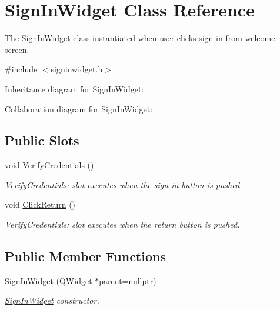 \hypertarget{classSignInWidget}{}\section{Sign\+In\+Widget Class Reference}
\label{classSignInWidget}


The \hyperlink{classSignInWidget}{Sign\+In\+Widget} class instantiated when user clicks sign in from welcome screen.  




{\ttfamily \#include $<$signinwidget.\+h$>$}



Inheritance diagram for Sign\+In\+Widget\+:


Collaboration diagram for Sign\+In\+Widget\+:
\subsection*{Public Slots}
\begin{DoxyCompactItemize}
\item 
void \hyperlink{classSignInWidget_a49decc48a2de009aa97b5a3358a76da7}{Verify\+Credentials} ()
\begin{DoxyCompactList}\small\item\em Verify\+Credentials\+: slot executes when the sign in button is pushed. \end{DoxyCompactList}\item 
void \hyperlink{classSignInWidget_a503bbf74ccb40642f4b05a48bb9dc99a}{Click\+Return} ()
\begin{DoxyCompactList}\small\item\em Verify\+Credentials\+: slot executes when the return button is pushed. \end{DoxyCompactList}\end{DoxyCompactItemize}
\subsection*{Public Member Functions}
\begin{DoxyCompactItemize}
\item 
\hyperlink{classSignInWidget_afd6abbeff046b789c1801981c8b7358d}{Sign\+In\+Widget} (Q\+Widget $\ast$parent=nullptr)
\begin{DoxyCompactList}\small\item\em \hyperlink{classSignInWidget}{Sign\+In\+Widget} constructor. \end{DoxyCompactList}\end{DoxyCompactItemize}
